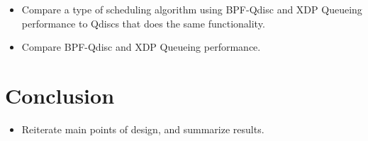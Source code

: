 \documentclass[sigconf, nonacm]{acmart}
\begin{document}
\begin{itemize}
  \item Compare a type of scheduling algorithm using BPF-Qdisc and XDP Queueing performance to Qdiscs that does the same functionality.
  \item Compare BPF-Qdisc and XDP Queueing performance.
\end{itemize}

\section{Conclusion}

\begin{itemize}
  \item Reiterate main points of design, and summarize results.
\end{itemize}





\end{document}
